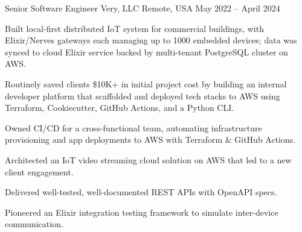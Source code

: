 \begin{cventries}
	\cventry
	{Senior Software Engineer} %
	{Very, LLC} %
	{Remote, USA} %
	{May 2022 -- April 2024} %
	{
		\begin{cvitems}
			\item Built local-first distributed IoT system for commercial buildings,
			with Elixir/Nerves gateways each managing up to 1000 embedded devices;
			data was synced to cloud Elixir service backed by multi-tenant PostgreSQL
			cluster on AWS.
			\item Routinely saved clients \$10K+ in initial project cost by building
			an internal developer platform that scaffolded and deployed tech stacks
			to AWS using Terraform, Cookiecutter, GitHub Actions, and a Python CLI.
			\item Owned CI/CD for a cross-functional team, automating infrastructure
			provisioning and app deployments to AWS with Terraform \& GitHub
			Actions.
			\item Architected an IoT video streaming cloud solution on AWS that
			led to a new client engagement.
			\item Delivered well-tested, well-documented REST APIs with OpenAPI specs.
			\columnbreak
			\item Pioneered an Elixir integration testing framework to simulate
			inter-device communication.

\end{cvitems}}
\end{cventries}

